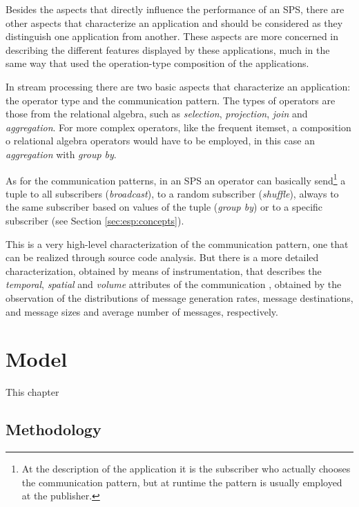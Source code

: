 \documentclass[ppgc,diss,english]{iiufrgs}
\begin{document}
Besides the aspects that directly influence the performance of an SPS, there are other aspects that characterize an application and should be considered as they distinguish one application from another. These aspects are more concerned in describing the different features displayed by these applications, much in the same way that \cite{balaprakash2013exascale} used the operation-type composition of the applications.

In stream processing there are two basic aspects that characterize an application: the operator type and the communication pattern. The types of operators are those from the relational algebra, such as \emph{selection}, \emph{projection}, \emph{join} and \emph{aggregation}. For more complex operators, like the frequent itemset, a composition o relational algebra operators would have to be employed, in this case an \emph{aggregation} with \emph{group by}.

As for the communication patterns, in an SPS an operator can basically send\footnote{At the description of the application it is the subscriber who actually chooses the communication pattern, but at runtime the pattern is usually employed at the publisher.} a tuple to all subscribers (\emph{broadcast}), to a random subscriber (\emph{shuffle}), always to the same subscriber based on values of the tuple (\emph{group by}) or to a specific subscriber (see Section \ref{sec:esp:concepts}).

This is a very high-level characterization of the communication pattern, one that can be realized through source code analysis. But there is a more detailed characterization, obtained by means of instrumentation, that describes the \emph{temporal}, \emph{spatial} and \emph{volume} attributes of the communication \cite{kim1998characterization}, obtained by the observation of the distributions of message generation rates, message destinations, and message sizes and average number of messages, respectively.


\chapter{Model}

This chapter

\section{Methodology}
\end{document}
